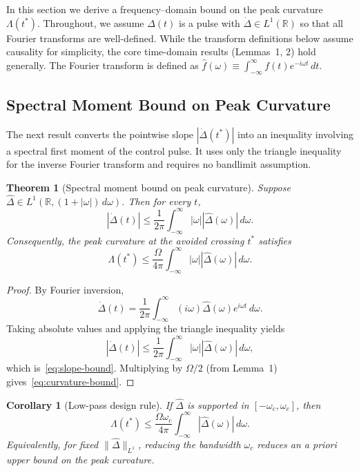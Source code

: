 \documentclass[11pt]{article}
\newtheorem{theorem}{Theorem}
\newtheorem{corollary}{Corollary}
\begin{document}
In this section we derive a frequency--domain bound on the peak curvature $\Lambda(t^*)$. Throughout, we assume $\Delta(t)$ is a pulse with $\dot{\Delta} \in L^1(\mathbb{R})$ so that all Fourier transforms are well-defined. While the transform definitions below assume causality for simplicity, the core time-domain results (Lemmas~1, 2) hold generally. The Fourier transform is defined as $\hat{f}(\omega) \equiv \int_{-\infty}^{\infty} f(t) e^{-i\omega t}\, dt$.

\subsection{Spectral Moment Bound on Peak Curvature}

The next result converts the pointwise slope $|\dot{\Delta}(t^*)|$ into an inequality involving a spectral first moment of the control pulse. It uses only the triangle inequality for the inverse Fourier transform and requires no bandlimit assumption.

\begin{theorem}[Spectral moment bound on peak curvature]
Suppose $\hat{\Delta} \in L^1(\mathbb{R}, (1 + |\omega|)\, d\omega)$. Then for every $t$,
\begin{equation}
    |\dot{\Delta}(t)| \le \frac{1}{2\pi} \int_{-\infty}^{\infty} |\omega| |\hat{\Delta}(\omega)|\, d\omega.
    \label{eq:slope-bound}
\end{equation}
Consequently, the peak curvature at the avoided crossing $t^*$ satisfies
\begin{equation}
    \Lambda(t^*) \le \frac{\Omega}{4\pi} \int_{-\infty}^{\infty} |\omega| |\hat{\Delta}(\omega)|\, d\omega.
    \label{eq:curvature-bound}
\end{equation}
\end{theorem}

\begin{proof}
By Fourier inversion,
\[
    \dot{\Delta}(t) = \frac{1}{2\pi} \int_{-\infty}^{\infty} (i\omega) \hat{\Delta}(\omega) e^{i\omega t}\, d\omega.
\]
Taking absolute values and applying the triangle inequality yields
\[
    |\dot{\Delta}(t)| \le \frac{1}{2\pi} \int_{-\infty}^{\infty} |\omega| |\hat{\Delta}(\omega)|\, d\omega,
\]
which is~\eqref{eq:slope-bound}. Multiplying by $\Omega/2$ (from Lemma~1) gives~\eqref{eq:curvature-bound}.
\end{proof}

\begin{corollary}[Low-pass design rule]
If $\hat{\Delta}$ is supported in $[-\omega_c, \omega_c]$, then
\begin{equation}
    \Lambda(t^*) \le \frac{\Omega \omega_c}{4\pi} \int_{-\infty}^{\infty} |\hat{\Delta}(\omega)|\, d\omega.
    \label{eq:bandlimit-bound}
\end{equation}
Equivalently, for fixed $\|\hat{\Delta}\|_{L^1}$, reducing the bandwidth $\omega_c$ reduces an a priori upper bound on the peak curvature.
\end{corollary}
\end{document}
